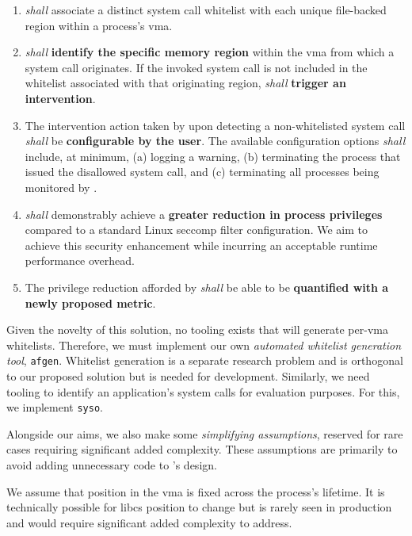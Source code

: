 \begin{enumerate}
    \item \af \textit{shall} associate a distinct system call whitelist with each unique file-backed region within a process's \ac{vma}.
    \item \af \textit{shall} \textbf{identify the specific memory region} within the \ac{vma} from which a system call originates. If the invoked system call is not included in the whitelist associated with that originating region, \af \textit{shall} \textbf{trigger an intervention}.
    \item The intervention action taken by \af upon detecting a non-whitelisted system call \textit{shall} be \textbf{configurable by the user}. The available configuration options \textit{shall} include, at minimum, (a) logging a warning, (b) terminating the process that issued the disallowed system call, and (c) terminating all processes being monitored by \af.
    \item \af \textit{shall} demonstrably achieve a \textbf{greater reduction in
        process privileges} compared to a standard Linux seccomp filter
        configuration. We aim to achieve this security enhancement while
        incurring an acceptable runtime performance overhead.
    \item The privilege reduction afforded by \af \textit{shall} be able to be
        \textbf{quantified
        with a newly proposed metric}.
\end{enumerate}

Given the novelty of this solution, no tooling exists that will generate
per-\ac{vma} whitelists. Therefore, we must implement our own \textit{automated whitelist 
generation tool}, \texttt{afgen}. Whitelist generation is a separate research problem and is
orthogonal to our proposed solution but is needed for development. 
Similarly, we need tooling to identify an application's system calls for
evaluation purposes. For this, we implement \texttt{syso}.


Alongside our aims, we also make some \textit{simplifying assumptions}, 
reserved for rare cases requiring significant added complexity. These 
assumptions are primarily to avoid adding unnecessary code to
\af's design. 
 
We assume that  position in the \ac{vma} is fixed across the process's
lifetime. It is technically possible for \acp{libc} position to change but is
rarely seen in production and would require significant added complexity to
address.

